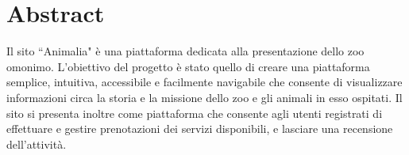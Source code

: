 \section{Abstract}
Il sito ``Animalia" è una piattaforma dedicata alla presentazione dello zoo omonimo.
L'obiettivo del progetto è stato quello di creare una piattaforma semplice, intuitiva, accessibile
e facilmente navigabile che consente di visualizzare informazioni circa la storia e la missione dello
zoo e gli animali in esso ospitati.
Il sito si presenta inoltre come piattaforma che consente agli utenti registrati di effettuare e gestire prenotazioni
dei servizi disponibili, e lasciare una recensione dell'attività.
